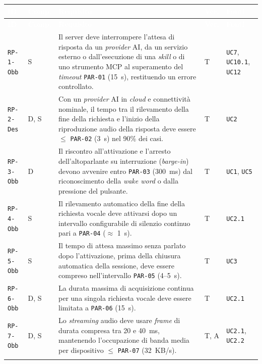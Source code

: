 \documentclass[12pt,a4paper]{article}
\newcommand{\thc}[1]{\textcolor{white}{\textbf{#1}}}
\newcommand{\rl}{\\ \arrayrulecolor{bfline}\hline}
\begin{document}
\begin{longtable}{>{\raggedright\arraybackslash}p{}>{\centering\arraybackslash}p{}>{\raggedright\arraybackslash}p{}>{\centering\arraybackslash}p{}>{\raggedright\arraybackslash}p{}}
\rowcolor{bfblue}\thc{ID} & \thc{Comp.} & \thc{Requisito} & \thc{Ver.} & \thc{Fonti} \\ \endfirsthead
\rowcolor{bfblue}\thc{ID} & \thc{Comp.} & \thc{Requisito} & \thc{Ver.} & \thc{Fonti} \\ \endhead
\texttt{RP-1-Obb} & S & Il server deve interrompere l'attesa di risposta da un \emph{provider} AI, da un servizio esterno o dall'esecuzione di una \emph{skill} o di uno strumento MCP al superamento del \emph{timeout} \texttt{PAR-01} (15~s), restituendo un errore controllato. & T & \texttt{UC7}, \texttt{UC10.1}, \texttt{UC12} \rl

\texttt{RP-2-Des} & D, S & Con un \emph{provider} AI in \emph{cloud} e connettività nominale, il tempo tra il rilevamento della fine della richiesta e l'inizio della riproduzione audio della risposta deve essere $\le$ \texttt{PAR-02} (3~s) nel 90\% dei casi. & T & \texttt{UC2} \rl

\texttt{RP-3-Obb} & D & Il riscontro all'attivazione e l'arresto dell'altoparlante su interruzione (\emph{barge-in}) devono avvenire entro \texttt{PAR-03} (300~ms) dal riconoscimento della \emph{wake word} o dalla pressione del pulsante. & T & \texttt{UC1}, \texttt{UC5} \rl

\texttt{RP-4-Obb} & S & Il rilevamento automatico della fine della richiesta vocale deve attivarsi dopo un intervallo configurabile di silenzio continuo pari a \texttt{PAR-04} ($\approx$ 1~s). & T & \texttt{UC2.1} \rl

\texttt{RP-5-Obb} & S & Il tempo di attesa massimo senza parlato dopo l'attivazione, prima della chiusura automatica della sessione, deve essere compreso nell'intervallo \texttt{PAR-05} (4--5~s). & T & \texttt{UC3} \rl

\texttt{RP-6-Obb} & D, S & La durata massima di acquisizione continua per una singola richiesta vocale deve essere limitata a \texttt{PAR-06} (15~s). & T & \texttt{UC2.1} \rl

\texttt{RP-7-Obb} & D, S & Lo \emph{streaming} audio deve usare \emph{frame} di durata compresa tra 20 e 40~ms, mantenendo l'occupazione di banda media per dispositivo $\le$ \texttt{PAR-07} (32~KB/s). & T, A & \texttt{UC2.1}, \texttt{UC2.2} \rl


\end{longtable}
\end{document}
